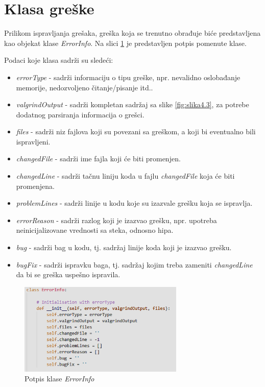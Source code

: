 \documentclass[12pt,oneside]{memoir}
\theoremstyle{plain}
\theoremstyle{definition}
\begin{document}
\section{Klasa greške}
Prilikom ispravljanja grešaka, greška koja se trenutno obrađuje biće predstavljena kao objekat klase \textit{ErrorInfo}. Na slici \ref{fig:slika4.1} je predstavljen potpis pomenute klase.

Podaci koje klasa sadrži su sledeći:
\begin{itemize}
\item \textit{errorType} - sadrži informaciju o tipu greške, npr. nevalidno oslobađanje memorije, nedozvoljeno čitanje/pisanje itd..
\item \textit{valgrindOutput} - sadrži kompletan sadržaj sa slike \ref{fig:slika4.3}, za potrebe dodatnog parsiranja informacija o grešci.
\item \textit{files} - sadrži niz fajlova koji su povezani sa greškom, a koji bi eventualno bili ispravljeni.
\item \textit{changedFile} - sadrži ime fajla koji će biti promenjen.
\item \textit{changedLine} - sadrži tačnu liniju koda u fajlu \textit{changedFile} koja će biti promenjena.
\item \textit{problemLines} - sadrži linije u kodu koje su izazvale grešku koja se ispravlja.
\item \textit{errorReason} - sadrži razlog koji je izazvao grešku, npr. upotreba neinicijalizovane vrednosti sa steka, odnosno hipa.
\item \textit{bug} - sadrži bag u kodu, tj. sadržaj linije koda koji je izazvao grešku.
\item \textit{bugFix} - sadrži ispravku baga, tj. sadržaj kojim treba zameniti \textit{changedLine} da bi se greška uspešno ispravila.
\end{itemize}

\begin{figure}[!ht]
  \centering
  \includegraphics[width=0.7\textwidth]{ErrorClass.png}
  \caption{Potpis klase \textit{ErrorInfo}}
  \label{fig:slika4.1}
\end{figure}
\end{document}
